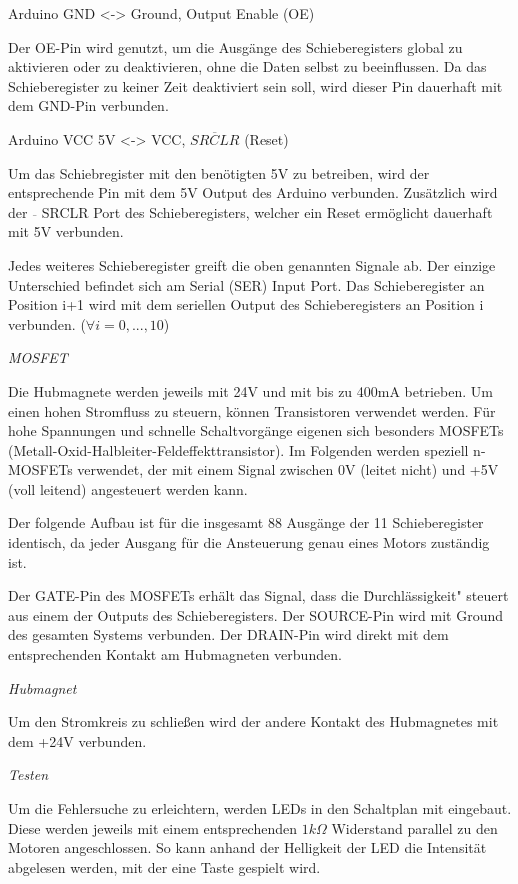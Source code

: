 Arduino GND <-> Ground, Output Enable (OE)

Der OE-Pin wird genutzt, um die Ausgänge des Schieberegisters global zu aktivieren oder zu deaktivieren, ohne die Daten selbst zu beeinflussen.
Da das Schieberegister zu keiner Zeit deaktiviert sein soll, wird dieser Pin dauerhaft mit dem GND-Pin verbunden.

Arduino VCC 5V <-> VCC, $\overline{SRCLR}$ (Reset)

Um das Schiebregister mit den benötigten 5V zu betreiben, wird der entsprechende Pin mit dem 5V Output des Arduino verbunden.
Zusätzlich wird der $\overline{ }$ SRCLR Port des Schieberegisters, welcher ein Reset ermöglicht dauerhaft mit 5V verbunden.

Jedes weiteres Schieberegister greift die oben genannten Signale ab.
Der einzige Unterschied befindet sich am Serial (SER) Input Port.
Das Schieberegister an Position i+1 wird mit dem seriellen Output des Schieberegisters an Position i verbunden. ($\forall i = 0,...,10$)

\textit{MOSFET}

Die Hubmagnete werden jeweils mit 24V und mit bis zu 400mA betrieben.
Um einen hohen Stromfluss zu steuern, können Transistoren verwendet werden.
Für hohe Spannungen und schnelle Schaltvorgänge eigenen sich besonders MOSFETs (Metall-Oxid-Halbleiter-Feldeffekttransistor).
Im Folgenden werden speziell n-MOSFETs verwendet, der mit einem Signal zwischen 0V (leitet nicht) und +5V (voll leitend) angesteuert werden kann.

Der folgende Aufbau ist für die insgesamt 88 Ausgänge der 11 Schieberegister identisch, da jeder Ausgang für die Ansteuerung genau eines Motors zuständig ist.

Der GATE-Pin des MOSFETs erhält das Signal, dass die \"Durchlässigkeit" steuert aus einem der Outputs des Schieberegisters.
Der SOURCE-Pin wird mit Ground des gesamten Systems verbunden.
Der DRAIN-Pin wird direkt mit dem entsprechenden Kontakt am Hubmagneten verbunden.

\textit{Hubmagnet}

Um den Stromkreis zu schließen wird der andere Kontakt des Hubmagnetes mit dem +24V verbunden.

\textit{Testen}

Um die Fehlersuche zu erleichtern, werden LEDs in den Schaltplan mit eingebaut.
Diese werden jeweils mit einem entsprechenden $1k\Omega$ Widerstand parallel zu den Motoren angeschlossen.
So kann anhand der Helligkeit der LED die Intensität abgelesen werden, mit der eine Taste gespielt wird.

